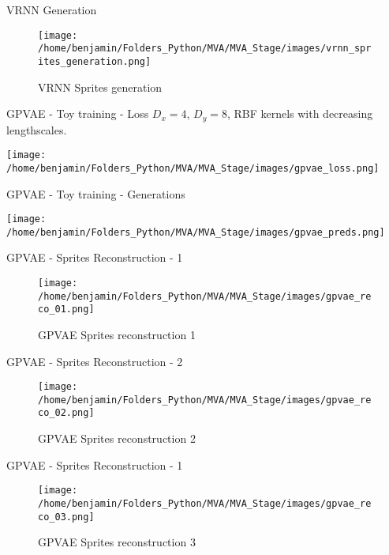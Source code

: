 \begin{frame}{VRNN Generation}
    \begin{figure}[H]
        \centering
        \texttt{[image: /home/benjamin/Folders\_Python/MVA/MVA\_Stage/images/vrnn\_sprites\_generation.png]}
        \caption{VRNN Sprites generation}
        \label{fig:sprite generation}
    \end{figure}
\end{frame}


\begin{frame}{GPVAE - Toy training - Loss}
    $D_x = 4$, $D_y=8$, RBF kernels with decreasing lengthscales.
    \begin{center}
    \texttt{[image: /home/benjamin/Folders\_Python/MVA/MVA\_Stage/images/gpvae\_loss.png]}
    \end{center}
\end{frame}

\begin{frame}{GPVAE - Toy training - Generations}
    \begin{center}
    \texttt{[image: /home/benjamin/Folders\_Python/MVA/MVA\_Stage/images/gpvae\_preds.png]}
    \end{center}
\end{frame}

\begin{frame}{GPVAE - Sprites Reconstruction - 1}
    \begin{figure}[H]
    \centering
    \texttt{[image: /home/benjamin/Folders\_Python/MVA/MVA\_Stage/images/gpvae\_reco\_01.png]}
    \caption{GPVAE Sprites reconstruction 1}
    \label{fig:GPVAE Sprites reconstruction 1}
\end{figure}
\end{frame}

\begin{frame}{GPVAE - Sprites Reconstruction - 2}
\begin{figure}[H]
    \centering
    \texttt{[image: /home/benjamin/Folders\_Python/MVA/MVA\_Stage/images/gpvae\_reco\_02.png]}
    \caption{GPVAE Sprites reconstruction 2}
    \label{fig:GPVAE Sprites reconstruction 2}
\end{figure}
\end{frame}

\begin{frame}{GPVAE - Sprites Reconstruction - 1}
\begin{figure}[H]
    \centering
    \texttt{[image: /home/benjamin/Folders\_Python/MVA/MVA\_Stage/images/gpvae\_reco\_03.png]}
    \caption{GPVAE Sprites reconstruction 3}
    \label{fig:GPVAE Sprites reconstruction 3}
\end{figure}
\end{frame}

